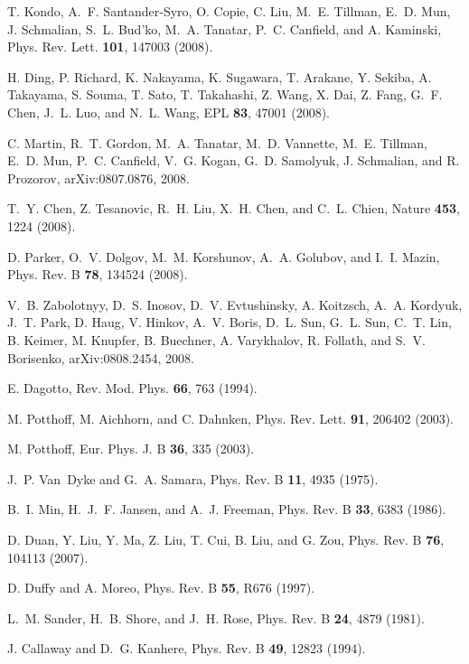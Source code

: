 \documentclass[aps,prb,superscriptaddress,preprintnumbers,
showpacs,legalpaper,twoside,twocolumn,amsmath,amssymb]{revtex4}
\begin{document}
\begin{thebibliography}{10}
T. Kondo, A.~F. Santander-Syro, O. Copie, C. Liu, M.~E. Tillman, E.~D. Mun, J.
  Schmalian, S.~L. Bud'ko, M.~A. Tanatar, P.~C. Canfield, and A. Kaminski,
  Phys. Rev. Lett. {\bf 101},  147003  (2008).

H. Ding, P. Richard, K. Nakayama, K. Sugawara, T. Arakane, Y. Sekiba, A.
  Takayama, S. Souma, T. Sato, T. Takahashi, Z. Wang, X. Dai, Z. Fang, G.~F.
  Chen, J.~L. Luo, and N.~L. Wang, EPL {\bf 83},  47001  (2008).

C. Martin, R.~T. Gordon, M.~A. Tanatar, M.~D. Vannette, M.~E. Tillman, E.~D.
  Mun, P.~C. Canfield, V.~G. Kogan, G.~D. Samolyuk, J. Schmalian, and R.
  Prozorov, arXiv:0807.0876, 2008.

T.~Y. Chen, Z. Tesanovic, R.~H. Liu, X.~H. Chen, and C.~L. Chien, Nature {\bf
  453},  1224  (2008).

D. Parker, O.~V. Dolgov, M.~M. Korshunov, A.~A. Golubov, and I.~I. Mazin, Phys.
  Rev. B {\bf 78},  134524  (2008).

V.~B. Zabolotnyy, D.~S. Inosov, D.~V. Evtushinsky, A. Koitzsch, A.~A. Kordyuk,
  J.~T. Park, D. Haug, V. Hinkov, A.~V. Boris, D.~L. Sun, G.~L. Sun, C.~T. Lin,
  B. Keimer, M. Knupfer, B. Buechner, A. Varykhalov, R. Follath, and S.~V.
  Borisenko, arXiv:0808.2454, 2008.

E. Dagotto, Rev. Mod. Phys. {\bf 66},  763  (1994).

M. Potthoff, M. Aichhorn, and C. Dahnken, Phys. Rev. Lett. {\bf 91},  206402
  (2003).

M. Potthoff, Eur. Phys. J. B {\bf 36},  335  (2003).



J.~P. Van~Dyke and G.~A. Samara, Phys. Rev. B {\bf 11},  4935  (1975).

B.~I. Min, H.~J.~F. Jansen, and A.~J. Freeman, Phys. Rev. B {\bf 33},  6383
  (1986).

D. Duan, Y. Liu, Y. Ma, Z. Liu, T. Cui, B. Liu, and G. Zou, Phys. Rev. B {\bf
  76},  104113  (2007).

D. Duffy and A. Moreo, Phys. Rev. B {\bf 55},  R676  (1997).

L.~M. Sander, H.~B. Shore, and J.~H. Rose, Phys. Rev. B {\bf 24},  4879
  (1981).

J. Callaway and D.~G. Kanhere, Phys. Rev. B {\bf 49},  12823  (1994).


\end{thebibliography}
\end{document}

